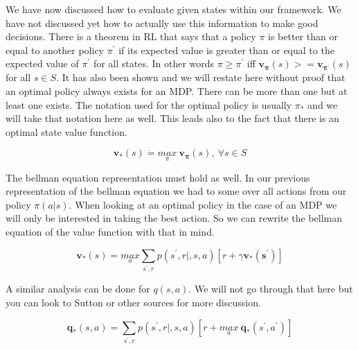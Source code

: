 We have now discussed how to evaluate given states within our framework. We have not discussed yet how to actually use this information to make good decisions. There is a theorem in RL that says that a policy $\pi$ is better than or equal to another policy $\pi^{'}$ if its expected value is greater than or equal to the expected value of $\pi^{'}$ for all states. In other words $ \pi \geq \pi^{'} $ iff $ \mathbf{v_{\pi}}(s) >= \mathbf{v_{\pi^{'}}}(s)$ for all $ s \in  S$. It has also been shown and we will restate here without proof that an optimal policy always exists for an MDP. There can be more than one but at least one exists. The notation used for the optimal policy is usually $\pi_{*}$ and we will take that notation here as well. This leads also to the fact that there is an optimal state value function. 

\begin{equation}\label{Optimal State Value Equation}
\mathbf{v_{*}}(s) \dot{=} \underset{\pi}{max} \: \mathbf{v_{\pi}}(s) , \: \forall s \in S 
\end{equation}

The bellman equation representation must hold as well. In our previous representation of the bellman equation we had to some over all actions from our policy $\pi(a |s)$. When looking at an optimal policy in the case of an MDP we will only be interested in taking the best action. So we can rewrite the bellman equation of the value function with that in mind. 

\begin{equation}\label{Optimal Bellman State Value Equation}
\mathbf{v_{*}}(s)= \underset{a}{max}\underset{s^{'},r}{\sum}p(s^{'},r|,s,a)[ r + \gamma \mathbf{v_{*}(s^{'})}]
\end{equation}


A similar analysis can be done for $q(s,a)$. We will not go through that here but you can look to Sutton or other sources for more discussion. 

\begin{equation}\label{Optimal Bellman State Action Value Equation}
\mathbf{q_{*}}(s,a)= \underset{s^{'},r}{\sum}p(s^{'},r|,s,a)[ r + \underset{a}{max} \: \mathbf{q_{*}}(s^{'},a^{'})]
\end{equation}

